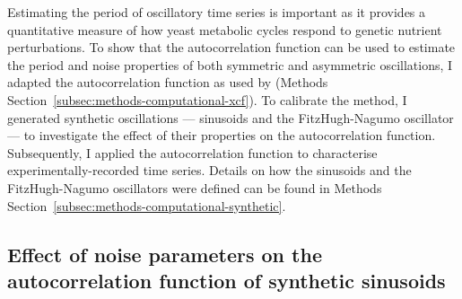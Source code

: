 Estimating the period of oscillatory time series is important as it provides a quantitative measure of how yeast metabolic cycles respond to genetic nutrient perturbations.
To show that the autocorrelation function can be used to estimate the period and noise properties of both symmetric and asymmetric oscillations, I adapted the autocorrelation function as used by \textcite{pietschDeterminingGrowthRates2023} (Methods Section~\ref{subsec:methods-computational-xcf}).
To calibrate the method, I generated synthetic oscillations --- sinusoids and the FitzHugh-Nagumo oscillator \parencite{fitzhughImpulsesPhysiologicalStates1961} --- to investigate the effect of their properties on the autocorrelation function.
Subsequently, I applied the autocorrelation function to characterise experimentally-recorded time series.
Details on how the sinusoids and the FitzHugh-Nagumo oscillators were defined can be found in Methods Section~\ref{subsec:methods-computational-synthetic}.

\subsection{Effect of noise parameters on the autocorrelation function of synthetic sinusoids}
\label{subsec:analysis-characterisation-acf-sinusoid}

